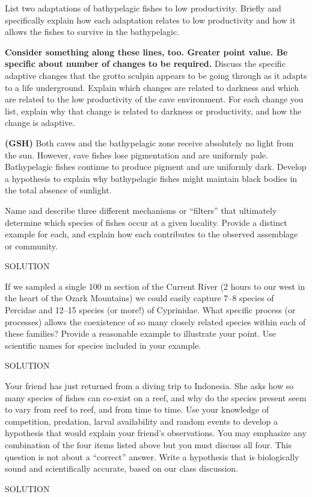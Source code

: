 \question[10]
List two adaptations of bathypelagic fishes to low productivity. Briefly and specifically explain how each adaptation relates to low productivity and how it allows the fishes to survive in the bathypelagic. 


\question[10]
\textbf{Consider something along these lines, too. Greater point value. Be specific about number of changes to be required.} Discuss the specific adaptive changes that the grotto sculpin appears to be going through as it adapts to a life underground.  Explain which changes are related to darkness and which are related to the low productivity of the cave environment.  For each change you list, explain why that change is related to darkness or productivity, and how the change is adaptive. 

\question[10]
\textbf{(GSH)} Both caves and the bathypelagic zone receive absolutely no light from the sun. However, cave fishes lose pigmentation and are uniformly pale. Bathypelagic fishes continue to produce pigment and are uniformly dark. Develop a hypothesis to explain why bathypelagic fishes might maintain black bodies in the total absence of sunlight.


\question[15]
Name and describe three different mechanisms or “filters” that ultimately determine which species of fishes occur at a given locality.  Provide a distinct example for each, and explain how each contributes to the observed assemblage or community.
\begin{solution}SOLUTION\end{solution}

\newpage

\question[15]
If we sampled a single 100 m section of the Current River (2 hours to our west in the heart of the Ozark Mountains) we could easily capture 7--8 species of Percidae and 12--15 species (or more!) of Cyprinidae.  What specific process (or processes) allows the coexistence of so many closely related species within each of these families? Provide a reasonable example to illustrate your point. Use scientific names for species included in your example. 
\begin{solution}SOLUTION\end{solution}
\newpage

\question[20]
Your friend has just returned from a diving trip to Indonesia.  She asks how so many species of fishes can co-exist on a reef, and why do the species present seem to vary from reef to reef, and from time to time. Use your knowledge of competition, predation, larval availability and random events to develop a hypothesis that would explain your friend’s observations.  You may emphasize any combination of the four items listed above but you must discuss all four.  This question is not about a “correct” answer.  Write a hypothesis that is biologically sound and scientifically accurate, based on our class discussion.
\begin{solution}SOLUTION\end{solution}

